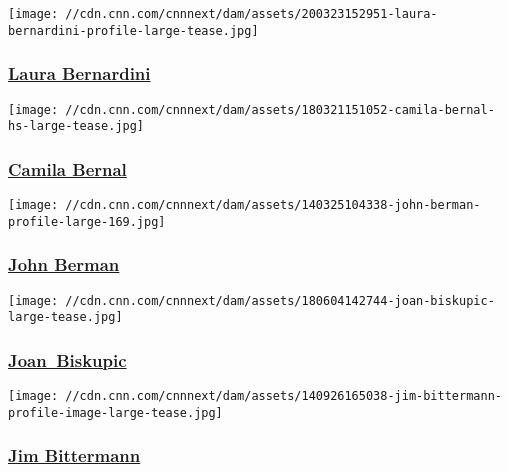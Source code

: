 \href{/profiles/laura-bernardini}{}

\texttt{[image: //cdn.cnn.com/cnnnext/dam/assets/200323152951-laura-bernardini-profile-large-tease.jpg]}

\hypertarget{laura-bernardini}{%
\subsubsection{\texorpdfstring{\href{/profiles/laura-bernardini}{Laura
Bernardini}}{Laura Bernardini}}\label{laura-bernardini}}

\href{/profiles/camila-bernal}{}

\texttt{[image: //cdn.cnn.com/cnnnext/dam/assets/180321151052-camila-bernal-hs-large-tease.jpg]}

\hypertarget{camila-bernal}{%
\subsubsection{\texorpdfstring{\href{/profiles/camila-bernal}{Camila
Bernal}}{Camila Bernal}}\label{camila-bernal}}

\href{/profiles/john-berman-profile}{}

\texttt{[image: //cdn.cnn.com/cnnnext/dam/assets/140325104338-john-berman-profile-large-169.jpg]}

\hypertarget{john-berman}{%
\subsubsection{\texorpdfstring{\href{/profiles/john-berman-profile}{John
Berman}}{John Berman}}\label{john-berman}}

\href{/profiles/joan-biskupic}{}

\texttt{[image: //cdn.cnn.com/cnnnext/dam/assets/180604142744-joan-biskupic-large-tease.jpg]}

\hypertarget{joan-biskupic}{%
\subsubsection{\texorpdfstring{\href{/profiles/joan-biskupic}{Joan~Biskupic}}{Joan~Biskupic}}\label{joan-biskupic}}

\href{/profiles/jim-bittermann}{}

\texttt{[image: //cdn.cnn.com/cnnnext/dam/assets/140926165038-jim-bittermann-profile-image-large-tease.jpg]}

\hypertarget{jim-bittermann}{%
\subsubsection{\texorpdfstring{\href{/profiles/jim-bittermann}{Jim
Bittermann}}{Jim Bittermann}}\label{jim-bittermann}}

